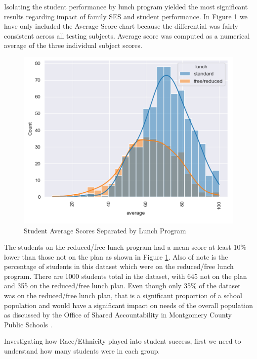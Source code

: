 \documentclass[man,floatsintext]{apa6} %
\begin{document}
Isolating the student performance by lunch program yielded the most significant results regarding impact of family SES and student performance. In Figure \ref{fig:lunch1} we have only included the Average Score chart because the differential was fairly consistent across all testing subjects. Average score was computed as a numerical average of the three individual subject scores.

\begin{figure}[H]
    \centering
    \includegraphics[width=0.75\linewidth]{StudentAvgScoresVSReducedLunch.png}
    \caption{Student Average Scores Separated by Lunch Program}
    \label{fig:lunch1}
\end{figure}
The students on the reduced/free lunch program had a mean score at least 10\% lower than those not on the plan as shown in Figure \ref{fig:lunch1}. Also of note is the percentage of students in this dataset which were on the reduced/free lunch program. There are 1000 students total in the dataset, with 645 not on the plan and 355 on the reduced/free lunch plan. Even though only 35\% of the dataset was on the reduced/free lunch plan, that is a significant proportion of a school population and would have a significant impact on needs of the overall population as discussed by the Office of Shared Accountability in Montgomery County Public Schools \cite{MCPSPoverty}.

Investigating how Race/Ethnicity played into student success, first we need to understand how many students were in each group.
\end{document}
